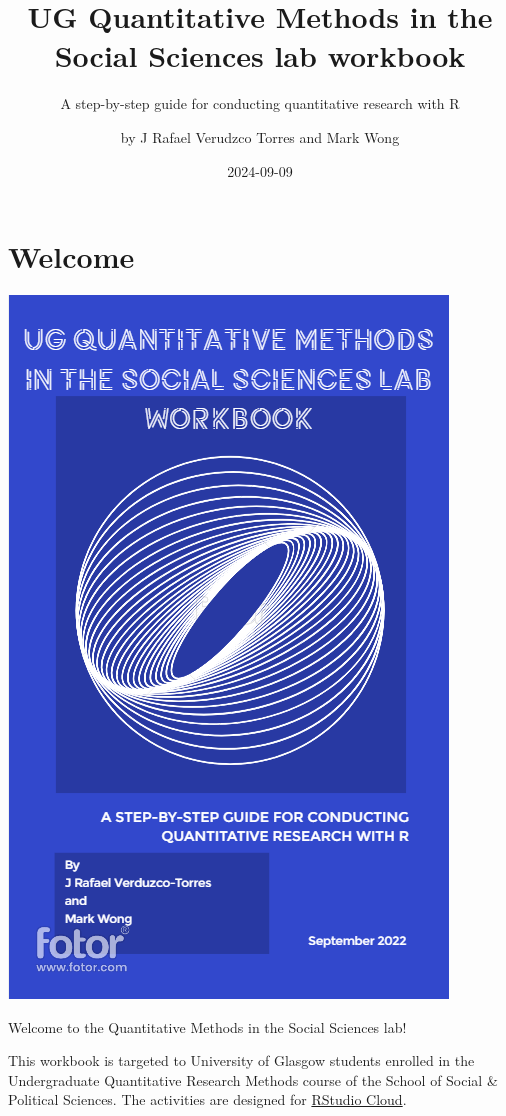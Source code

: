 \documentclass[
]{book}
\title{UG Quantitative Methods in the Social Sciences lab workbook}
\subtitle{A step-by-step guide for conducting quantitative research with R}
\author{by J Rafael Verudzco Torres and Mark Wong}
\date{2024-09-09}
\begin{document}
\maketitle

{
\setcounter{tocdepth}{1}
\tableofcontents
}
\hypertarget{Welcome}{%
\chapter*{Welcome}\label{Welcome}}

\includegraphics{./images/cover.PNG}

Welcome to the Quantitative Methods in the Social Sciences lab!

This workbook is targeted to University of Glasgow students enrolled in the Undergraduate Quantitative Research Methods course of the School of Social \& Political Sciences. The activities are designed for \href{https://rstudio.cloud/}{RStudio Cloud}.
\end{document}
